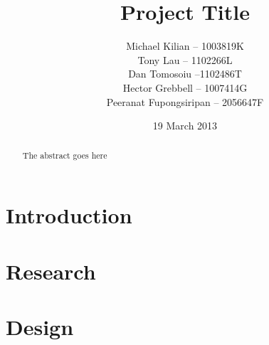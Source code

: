 \documentclass{l3proj}
\begin{document}
\title{Project Title}
\author{Michael Kilian -- 1003819K \\
        Tony Lau -- 1102266L\\
        Dan Tomosoiu --1102486T \\
        Hector Grebbell -- 1007414G \\
        Peeranat Fupongsiripan -- 2056647F}
\date{19 March 2013}
\maketitle
\begin{abstract}

The abstract goes here

\end{abstract}
\educationalconsent
\tableofcontents
\chapter{Introduction}
\label{intro}



%


\chapter{Research}
\label{research}






\chapter{Design}
\label{design}
\end{document}
